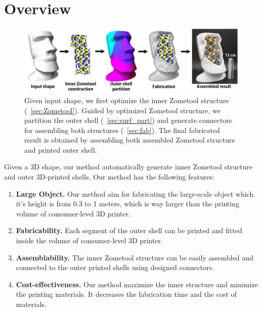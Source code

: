 \section{Overview}
\label{sec:overview}

\begin{figure}[h]
\centering
\includegraphics[width=1.0\linewidth]{figs/pipeline2.pdf} 
\caption{
Given input shape, we first optimize the inner Zometool structure (\secname~\ref{sec:Zometool}). Guided by optimized Zometool structure, we partition the outer shell (\secname~\ref{sec:surf_part}) and generate connectors for assembling both structures (\secname~\ref{sec:fab}).
The final fabricated result is obtained by assembling both assembled Zometool structure and printed outer shell.
}
\label{fig:result-pipeline}
\end{figure}

Given a 3D shape, our method automatically generate inner Zometool structure and outer 3D-printed shells.
Our method has the following features:
\begin{enumerate}
\item \textbf{Large Object.} Our method aim for fabricating the large-scale object which it's height is from 0.3 to 1 meters, which is way larger than the printing volume of  consumer-level 3{D} printer.
\item \textbf{Fabricability.} Each segment of the outer shell can be printed and fitted inside the volume of consumer-level 3{D} printer.
\item \textbf{Assemblability.} The inner Zometool structure can be easily assembled and connected to the outer printed shells using
 designed connectors.
\item \textbf{Cost-effectiveness.} Our method maximize the inner structure and minimize the printing materials. 
It decreases the fabrication time and the cost of materials.
\end{enumerate}

